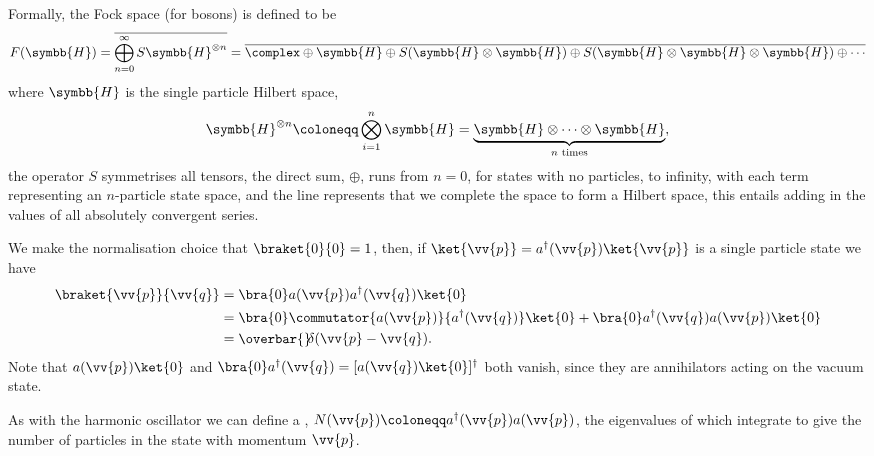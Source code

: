 \documentclass[fleqn]{NotesClass}
\newcommand{\hermit}{{\dagger}}
\newcommand\bardelta{\ThisStyle{\ensurestackMath{%
            \stackengine{-.3\LMpt}{\SavedStyle \delta}{\SavedStyle\overbar{}%
                \mkern4.5mu}{O}{r}{F}{F}{L}}}}
\newcommand{\hilbertSpace}{\symbb{H}}
\begin{document}
    Formally, the Fock space (for bosons) is defined to be
    \begin{equation}
        F(\hilbertSpace) = \overline{\bigoplus_{n = 0}^{\infty} S \hilbertSpace^{\otimes n}} = \overline{\complex \oplus \hilbertSpace \oplus S(\hilbertSpace \otimes \hilbertSpace) \oplus S(\hilbertSpace \otimes \hilbertSpace \otimes \hilbertSpace) \oplus \dotsb}
    \end{equation}
    where \(\hilbertSpace\) is the single particle Hilbert space,
    \begin{equation}
        \hilbertSpace^{\otimes n} \coloneqq \bigotimes_{i = 1}^{n}\hilbertSpace = \underbrace{\hilbertSpace \otimes \dotsb \otimes \hilbertSpace}_{n \text{ times}},
    \end{equation}
    the operator \(S\) symmetrises all tensors, the direct sum, \(\oplus\), runs from \(n = 0\), for states with no particles, to infinity, with each term representing an \(n\)-particle state space, and the line represents that we complete the space to form a Hilbert space, this entails adding in the values of all absolutely convergent series.
    
    We make the normalisation choice that \(\braket{0}{0} = 1\), then, if \(\ket{\vv{p}} = a^\hermit(\vv{p})\ket{\vv{p}}\) is a single particle state we have
    \begin{align}
        \braket{\vv{p}}{\vv{q}} &= \bra{0} a(\vv{p}) a^\hermit(\vv{q})\ket{0}\\
        &= \bra{0} \commutator{a(\vv{p})}{a^\hermit(\vv{q})}\ket{0} + \bra{0} a^\hermit(\vv{q}) a(\vv{p})\ket{0}\\
        &= \bardelta(\vv{p} - \vv{q}).
    \end{align}
    Note that \(a(\vv{p})\ket{0}\) and \(\bra{0}a^\hermit(\vv{q}) = [a(\vv{q}) \ket{0}]^\hermit\) both vanish, since they are annihilators acting on the vacuum state.
    
    As with the harmonic oscillator we can define a , \(N(\vv{p}) \coloneqq a^\hermit(\vv{p})a(\vv{p})\), the eigenvalues of which integrate to give the number of particles in the state with momentum \(\vv{p}\).
    
\end{document}
